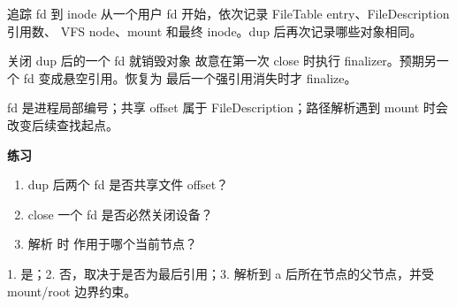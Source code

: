 
\begin{experimentbox}{追踪 fd 到 inode}
从一个用户 fd 开始，依次记录 FileTable entry、FileDescription 引用数、
VFS node、mount 和最终 inode。dup 后再次记录哪些对象相同。
\end{experimentbox}

\begin{faultinjectionbox}{关闭 dup 后的一个 fd 就销毁对象}
故意在第一次 close 时执行 finalizer。预期另一个 fd 变成悬空引用。恢复为
最后一个强引用消失时才 finalize。
\end{faultinjectionbox}

\begin{pitfallbox}
fd 是进程局部编号；共享 offset 属于 FileDescription；路径解析遇到 mount
时会改变后续查找起点。
\end{pitfallbox}

\textbf{练习}
\begin{enumerate}[leftmargin=2.2em]
  \item dup 后两个 fd 是否共享文件 offset？
  \item close 一个 fd 是否必然关闭设备？
  \item 解析  时  作用于哪个当前节点？
\end{enumerate}
\begin{answerbox}
1. 是；2. 否，取决于是否为最后引用；3. 解析到 a 后所在节点的父节点，并受
mount/root 边界约束。
\end{answerbox}
